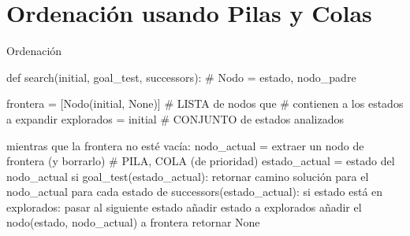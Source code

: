 \documentclass[10pt,envcountsect,spanish]{beamer}
\begin{document}
\section{Ordenación usando Pilas y Colas}

\begin{frame}[fragile]{Ordenación}

\begin{pyverbatim}[][frame=single]
def search(initial, goal_test, successors):
  # Nodo = {estado, nodo_padre}
  
  frontera = [Nodo(initial, None)]  # LISTA de nodos que 
                    # contienen a los estados a expandir
  explorados = {initial} # CONJUNTO de estados analizados
  
  mientras que la frontera no esté vacía:
     nodo_actual = extraer un nodo de frontera (y borrarlo) # PILA, COLA (de prioridad)
     estado_actual = estado del nodo_actual
     si goal_test(estado_actual):
         retornar camino solución para el nodo_actual
     para cada estado de successors(estado_actual):
         si estado está en explorados:
             pasar al siguiente estado
         añadir estado a explorados
         añadir el nodo(estado, nodo_actual) a frontera
  retornar None
\end{pyverbatim}

\end{frame}
\end{document}
